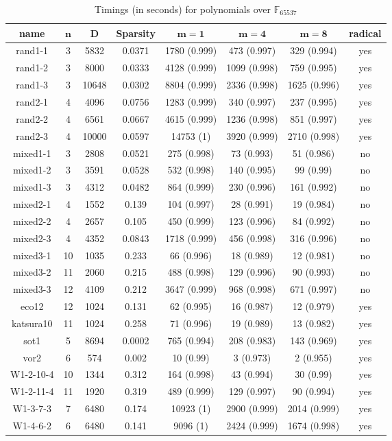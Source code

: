 \documentclass[12pt]{article}
\def\F {\ensuremath{\mathbb{F}}}
\begin{document}
\begin{table}
 \def\arraystretch{1.2}
\setlength\tabcolsep{6pt}
	\caption{Timings (in seconds) for polynomials over $\F_{65537}$}
	\begin{tabular}{c|c|c|c|c|c|c|c}
		\textbf{name}& $\bm{n}$ & $\bm{D}$ & \textbf{Sparsity} & $\bm{m = 1}$ & $\bm{m = 4}$ & $\bm{m = 8}$ & radical \\
		\hline
		rand1-1&3 &5832&0.0371&1780 (0.999)&473 (0.997)&329 (0.994)&yes\\
		rand1-2&3 &8000&0.0333&4128 (0.999)&1099 (0.998)&759 (0.995)&yes\\
		rand1-3&3 &10648&0.0302&8804 (0.999)&2336 (0.998)&1625 (0.996)&yes\\
		rand2-1&4 &4096&0.0756&1283 (0.999)&340 (0.997)&237 (0.995)&yes\\
		rand2-2&4 &6561&0.0667&4615 (0.999)&1236 (0.998)&851 (0.997)&yes\\
		rand2-3&4 &10000&0.0597&14753 (1)&3920 (0.999)&2710 (0.998)&yes\\
		
		mixed1-1&3 &2808&0.0521&275 (0.998)&73 (0.993)&51 (0.986)&no\\
		mixed1-2&3 &3591&0.0528&532 (0.998)&140 (0.995)&99 (0.99)&no\\
		mixed1-3&3 &4312&0.0482&864 (0.999)&230 (0.996)&161 (0.992)&no\\
		mixed2-1&4 &1552&0.139&104 (0.997)&28 (0.991)&19 (0.984)&no\\
		mixed2-2&4 &2657&0.105&450 (0.999)&123 (0.996)&84 (0.992)&no\\
		mixed2-3&4 &4352&0.0843&1718 (0.999)&456 (0.998)&316 (0.996)&no\\
		
		mixed3-1&10 &1035&0.233&66 (0.996)&18 (0.989)&12 (0.981)&no\\
		mixed3-2&11 &2060&0.215&488 (0.998)&129 (0.996)&90 (0.993)&no\\
		mixed3-3&12 &4109&0.212&3647 (0.999)&968 (0.998)&671 (0.997)&no\\
		
		eco12&12 &1024&0.131&62 (0.995)&16 (0.987)&12 (0.979)&yes\\
		katsura10&11 &1024&0.258&71 (0.996)&19 (0.989)&13 (0.982)&yes\\
		sot1&5 &8694&0.0002&765 (0.994)&208 (0.983)&143 (0.969)&yes\\
		vor2&6 &574&0.002&10 (0.99)&3 (0.973)&2 (0.955)&yes\\
		W1-2-10-4&10 &1344&0.312&164 (0.998)&43 (0.994)&30 (0.99)&yes\\
		W1-2-11-4&11 &1920&0.319&489 (0.999)&129 (0.997)&90 (0.994)&yes\\
		W1-3-7-3&7 &6480&0.174&10923 (1)&2900 (0.999)&2014 (0.999)&yes\\
		W1-4-6-2&6 &6480&0.141&9096 (1)&2424 (0.999)&1674 (0.998)&yes
	\end{tabular}
\end{table}
\end{document}

